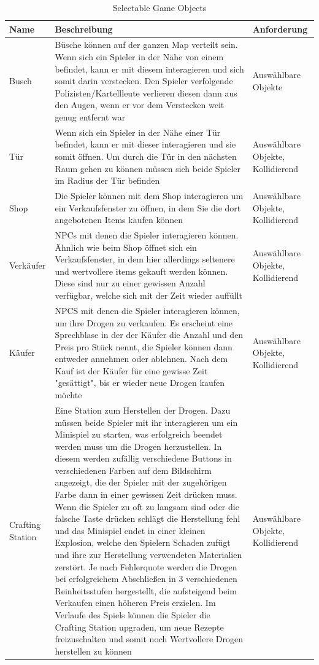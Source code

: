 \documentclass{article}
\begin{document}
\begin{table}[h!]
\centering
\renewcommand{\arraystretch}{1.5} %
\setlength{\tabcolsep}{6pt} %
\begin{tabular}{|m{2.5cm}|m{9cm}|m{3.5cm}|}
\hline
\textbf{Name} & \textbf{Beschreibung} & \textbf{Anforderung} \\ \hline
Busch & Büsche können auf der ganzen Map verteilt sein. Wenn sich ein Spieler in der Nähe von einem befindet, kann er mit diesem interagieren und sich somit darin verstecken. Den Spieler verfolgende Polizisten/Kartellleute verlieren diesen dann aus den Augen, wenn er vor dem Verstecken weit genug entfernt war& Auswählbare Objekte \\ \hline
Tür & Wenn sich ein Spieler in der Nähe einer Tür befindet, kann er mit dieser interagieren und sie somit öffnen. Um durch die Tür in den nächsten Raum gehen zu können müssen sich beide Spieler im Radius der Tür befinden  & Auswählbare Objekte, Kollidierend \\ \hline
Shop & Die Spieler können mit dem Shop interagieren um ein Verkaufsfenster zu öffnen, in dem Sie die dort angebotenen Items kaufen können & Auswählbare Objekte, Kollidierend \\ \hline
Verkäufer & NPCs mit denen die Spieler interagieren können. Ähnlich wie beim Shop öffnet sich ein Verkaufsfenster, in dem hier allerdings seltenere und wertvollere items gekauft werden können. Diese sind nur zu einer gewissen Anzahl verfügbar, welche sich mit der Zeit wieder auffüllt  & Auswählbare Objekte, Kollidierend \\ \hline
Käufer & NPCS mit denen die Spieler interagieren können, um ihre Drogen zu verkaufen. Es erscheint eine Sprechblase in der der Käufer die Anzahl und den Preis pro Stück nennt, die Spieler können dann entweder annehmen oder ablehnen. Nach dem Kauf ist der Käufer für eine gewisse Zeit "gesättigt", bis er wieder neue Drogen kaufen möchte & Auswählbare Objekte, Kollidierend \\ \hline
Crafting Station & Eine Station zum Herstellen der Drogen. Dazu müssen beide Spieler mit ihr interagieren um ein Minispiel zu starten, was erfolgreich beendet werden muss um die Drogen herzustellen. In diesem werden zufällig verschiedene Buttons in verschiedenen Farben auf dem Bildschirm angezeigt, die der Spieler mit der zugehörigen Farbe dann in einer gewissen Zeit drücken muss. Wenn die Spieler zu oft zu langsam sind oder die falsche Taste drücken schlägt die Herstellung fehl und das Minispiel endet in einer kleinen Explosion, welche den Spielern Schaden zufügt und ihre zur Herstellung verwendeten Materialien zerstört. Je nach Fehlerquote werden die Drogen bei erfolgreichem Abschließen in 3 verschiedenen Reinheitsstufen hergestellt, die aufsteigend beim Verkaufen einen höheren Preis erzielen. Im Verlaufe des Spiels können die Spieler die Crafting Station upgraden, um neue Rezepte freizuschalten und somit noch Wertvollere Drogen herstellen zu können & Auswählbare Objekte, Kollidierend \\ \hline
\end{tabular}
\caption{Selectable Game Objects}
\label{tab:example}
\end{table}
\newpage

\end{document}
